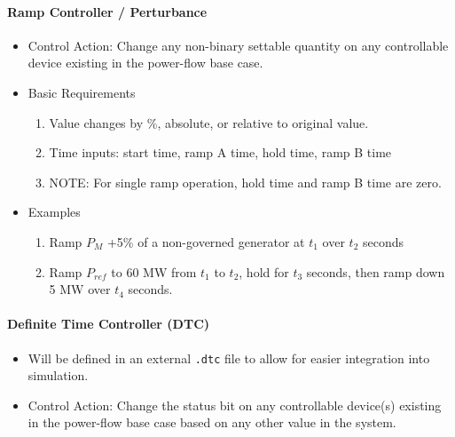 \documentclass[12pt]{article}
\newcommand{\q}{(\textit{\textbf{?}})}
\begin{document}
\begin{multicols*}{2}
\paragraph{Ramp Controller / Perturbance}
\begin{itemize}
	\item Control Action: Change any non-binary settable quantity on any controllable device existing in the power-flow base case.
	\item Basic Requirements
	\begin{enumerate}
		\item Value changes by \%, absolute, or relative to original value.
		\item Time inputs: start time, ramp A time, hold time, ramp B time
		\item NOTE: For single ramp operation, hold time and ramp B time are zero.
	\end{enumerate}
	\item Examples
	\begin{enumerate}
	\item Ramp $P_{M}$ +5\% of a non-governed generator at $t_1$ over $t_2$ seconds
	\item Ramp $P_{ref}$ to 60 MW from $t_1$ to $t_2$, hold for $t_3$ seconds, then ramp down 5 MW over $t_4$ seconds.
	\end{enumerate}	
	
\end{itemize}

\vfill\null
\columnbreak
%
\vspace{0pt}
\paragraph{Definite Time Controller (DTC)}
\begin{itemize}
\item Will be defined in an external \verb|.dtc| file to allow for easier integration into simulation.

	\item Control Action: Change the status bit on any controllable device(s) existing in the power-flow base case based on any other value in the system.
	

\end{itemize}
\end{multicols*}
\end{document}
